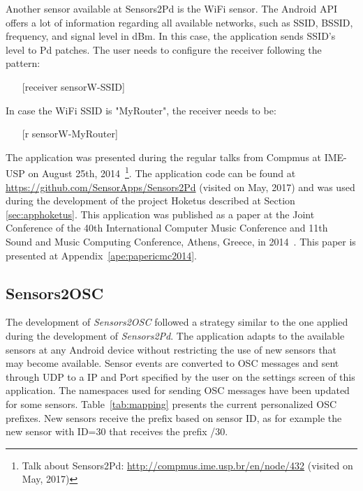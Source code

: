 Another sensor available at Sensors2Pd is the WiFi sensor.
The Android API offers a lot of information regarding all available networks, such as SSID, BSSID, frequency, and signal level in dBm.
In this case, the application sends SSID's level to Pd patches.
The user needs to configure the receiver following the pattern:

\begin{itemize}\itemsep0em
\item[]    [receiver sensorW-{SSID}]
\end{itemize}

In case the WiFi SSID is "MyRouter", the receiver needs to be:

\begin{itemize}\itemsep0em
\item[]    [r sensorW-MyRouter]
\end{itemize}

The application was presented during the regular talks from Compmus at IME-USP on August 25th, 2014~\footnote{Talk about Sensors2Pd: \url{http://compmus.ime.usp.br/en/node/432} (visited on May, 2017)}.
The application code can be found at \url{https://github.com/SensorApps/Sensors2Pd} (visited on May, 2017) and was used during the development of the project Hoketus described at Section \ref{sec:apphoketus}.
This application was published as a paper at the Joint Conference of the 40th International Computer Music Conference and 11th Sound and Music Computing Conference, Athens, Greece, in 2014~\citep{deCarvalhoJunior2014sensors2pd}.
This paper is presented at Appendix~\ref{ape:papericmc2014}.

\subsection*{Sensors2OSC}
\label{apesubsec:appsensors2osc}

The development of \textit{Sensors2OSC} followed a strategy similar to the one applied during the development of \textit{Sensors2Pd}.
The application adapts to the available sensors at any Android device without restricting the use of new sensors that may become available.
Sensor events are converted to OSC messages and sent through UDP to a IP and Port specified by the user on the settings screen of this application.
The namespaces used for sending OSC messages have been updated for some sensors.
Table~\ref{tab:mapping} presents the current personalized OSC prefixes.
New sensors receive the prefix based on sensor ID, as for example the new sensor with ID=30 that receives the prefix /30.

